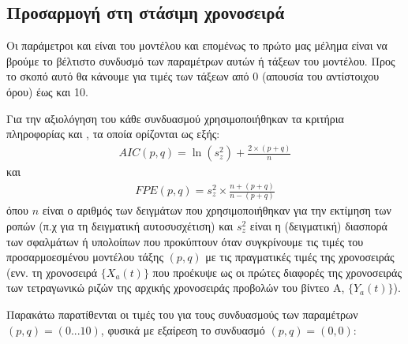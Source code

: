 \subsection{Προσαρμογή  στη στάσιμη χρονοσειρά}

Οι παράμετροι  και  είναι  του μοντέλου και επομένως το πρώτο μας μέλημα είναι να βρούμε το βέλτιστο συνδυσμό των παραμέτρων αυτών ή τάξεων του μοντέλου. Προς το σκοπό αυτό θα κάνουμε  για τιμές των τάξεων από 0 (απουσία του αντίστοιχου όρου) έως και 10.\par

Για την αξιολόγηση του κάθε συνδυασμού χρησιμοποιήθηκαν τα κριτήρια πληροφορίας  και , τα οποία ορίζονται ως εξής:
\begin{align}
AIC(p,q) = \ln{\left(s_z^2\right)} + \frac{2\times(p+q)}{n}
\label{eq:aic}
\end{align}
και
\begin{align}
FPE(p,q) = s_z^2 \times \frac{n + (p+q)}{n - (p+q)}
\label{eq:fpe}
\end{align}
όπου $n$ είναι ο αριθμός των δειγμάτων που χρησιμοποιήθηκαν για την εκτίμηση των ροπών (π.χ για τη δειγματική αυτοσυσχέτιση) και $s_z^2$ είναι η (δειγματική) διασπορά των σφαλμάτων ή υπολοίπων που προκύπτουν όταν συγκρίνουμε τις τιμές του προσαρμοεσμένου μοντέλου τάξης $(p,q)$ με τις πραγματικές τιμές της χρονοσειράς (ενν. τη χρονοσειρά $\{X_a(t)\}$ που προέκυψε ως οι πρώτες διαφορές της χρονοσειράς των τετραγωνικώ ριζών της αρχικής χρονοσειράς προβολών του βίντεο Α, $\{Y_a(t)\}$). \par

Παρακάτω παρατίθενται οι τιμές του  για τους συνδυασμούς των παραμέτρων $(p,q)=(0...10)$, φυσικά με εξαίρεση το συνδυασμό $(p,q)=(0,0)$:

